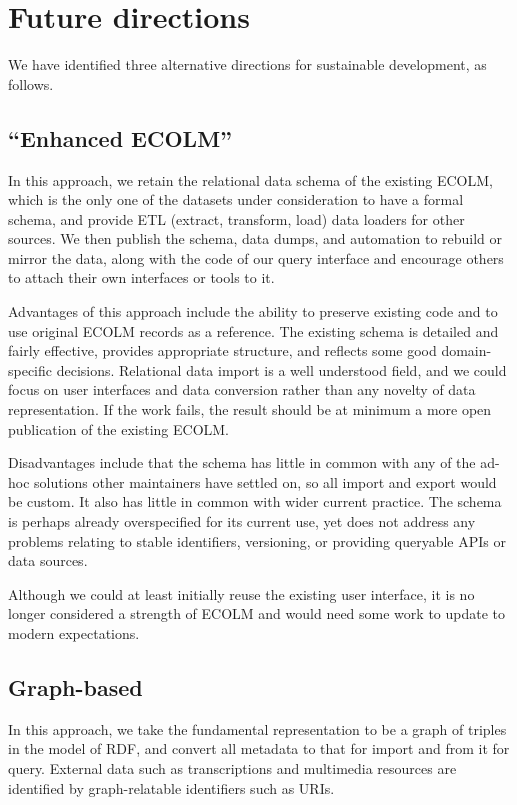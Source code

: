 \documentclass[sigconf, nonacm=true]{acmart}
\begin{document}
\begin{sloppypar}
  \section{Future directions}

  We have identified three alternative directions for sustainable
  development, as follows.
  
  \subsection{``Enhanced ECOLM''}

  In this approach, we retain the relational data schema of the
  existing ECOLM, which is the only one of the datasets under
  consideration to have a formal schema, and provide ETL (extract,
  transform, load) data loaders for other sources. We then publish the
  schema, data dumps, and automation to rebuild or mirror the data,
  along with the code of our query interface and encourage others to
  attach their own interfaces or tools to it.

  Advantages of this approach include the ability to preserve existing
  code and to use original ECOLM records as a reference. The existing
  schema is detailed and fairly effective, provides appropriate
  structure, and reflects some good domain-specific
  decisions. Relational data import is a well understood field, and we
  could focus on user interfaces and data conversion rather than any
  novelty of data representation. If the work fails, the result should
  be at minimum a more open publication of the existing ECOLM.

  Disadvantages include that the schema has little in common with any
  of the ad-hoc solutions other maintainers have settled on, so all
  import and export would be custom. It also has little in common with
  wider current practice. The schema is perhaps already overspecified
  for its current use, yet does not address any problems relating to
  stable identifiers, versioning, or providing queryable APIs or data
  sources.

  Although we could at least initially reuse the existing user
  interface, it is no longer considered a strength of ECOLM and would
  need some work to update to modern expectations.

  \subsection{Graph-based}

  In this approach, we take the fundamental representation to be a
  graph of triples in the model of RDF, and convert all metadata to
  that for import and from it for query. External data such as
  transcriptions and multimedia resources are identified by
  graph-relatable identifiers such as URIs.


\end{sloppypar}
\end{document}
